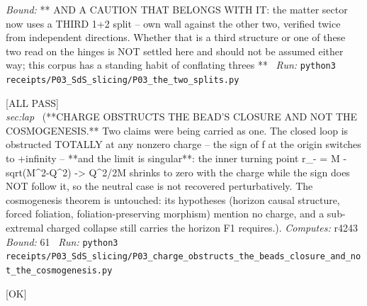 \begin{description}
 \emph{Bound:} ** AND A CAUTION THAT BELONGS WITH IT: the matter sector now uses a THIRD 1+2 split -- own wall against the other two, verified twice from independent directions. Whether that is a third structure or one of these two read on the hinges is NOT settled here and should not be assumed either way; this corpus has a standing habit of conflating threes **
\ \emph{Run:} \texttt{python3 receipts/P03\_SdS\_slicing/P03\_the\_two\_splits.py}
\item[\label{rcpt:P03_charge_obstructs_the_beads_closure_and_not_the_cosmogenesis}\texttt{P03\_charge\_obstructs\_the\_beads\_closure\_and\_not\_the\_cosmogenesis}]\hfill\textsf{[ALL PASS]}\\
\textit{sec:lap} \ (**CHARGE OBSTRUCTS THE BEAD'S CLOSURE AND NOT THE COSMOGENESIS.** Two claims were being carried as one. The closed loop is obstructed TOTALLY at any nonzero charge -- the sign of f at the origin switches to +infinity -- **and the limit is singular**: the inner turning point r\_- = M - sqrt(M\textasciicircum{}2-Q\textasciicircum{}2) -> Q\textasciicircum{}2/2M shrinks to zero with the charge while the sign does NOT follow it, so the neutral case is not recovered perturbatively. The cosmogenesis theorem is untouched: its hypotheses (horizon causal structure, forced foliation, foliation-preserving morphism) mention no charge, and a sub-extremal charged collapse still carries the horizon F1 requires.). 
\emph{Computes:} r4243
 \emph{Bound:} 61
\ \emph{Run:} \texttt{python3 receipts/P03\_SdS\_slicing/P03\_charge\_obstructs\_the\_beads\_closure\_and\_not\_the\_cosmogenesis.py}
\item[\label{rcpt:P03_the_sixth_equivalence}\texttt{P03\_the\_sixth\_equivalence}]\hfill\textsf{[OK]}\\

\end{description}
